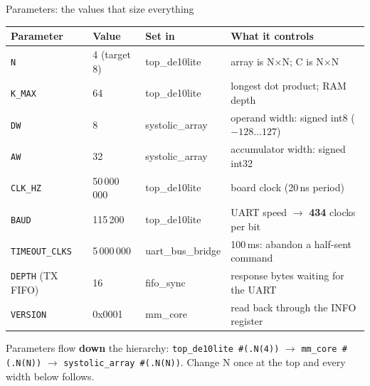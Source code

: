 \documentclass[aspectratio=169,11pt]{beamer}
\newcommand{\sig}[1]{\texttt{#1}}
\begin{document}
\begin{frame}{Parameters: the values that size everything}
  \centering\small
  \begin{tabular}{@{}l l l p{62mm}@{}}
    \toprule
    \textbf{Parameter} & \textbf{Value} & \textbf{Set in} & \textbf{What it controls} \\
    \midrule
    \sig{N}            & 4 (target 8)   & top\_de10lite  & array is N$\times$N; C is N$\times$N \\
    \sig{K\_MAX}       & 64             & top\_de10lite  & longest dot product; RAM depth \\
    \sig{DW}           & 8              & systolic\_array & operand width: signed int8 ($-128\ldots127$) \\
    \sig{AW}           & 32             & systolic\_array & accumulator width: signed int32 \\
    \sig{CLK\_HZ}      & 50\,000\,000   & top\_de10lite  & board clock (20\,ns period) \\
    \sig{BAUD}         & 115\,200       & top\_de10lite  & UART speed $\to$ \textbf{434} clocks per bit \\
    \sig{TIMEOUT\_CLKS}& 5\,000\,000    & uart\_bus\_bridge & 100\,ms: abandon a half-sent command \\
    \sig{DEPTH} (TX FIFO) & 16          & fifo\_sync     & response bytes waiting for the UART \\
    \sig{VERSION}      & 0x0001         & mm\_core       & read back through the INFO register \\
    \bottomrule
  \end{tabular}
  \vspace{3mm}

  \raggedright\footnotesize
  Parameters flow \textbf{down} the hierarchy: \sig{top\_de10lite \#(.N(4))} $\to$
  \sig{mm\_core \#(.N(N))} $\to$ \sig{systolic\_array \#(.N(N))}. Change N once at the top and every
  width below follows.
\end{frame}
\end{document}
